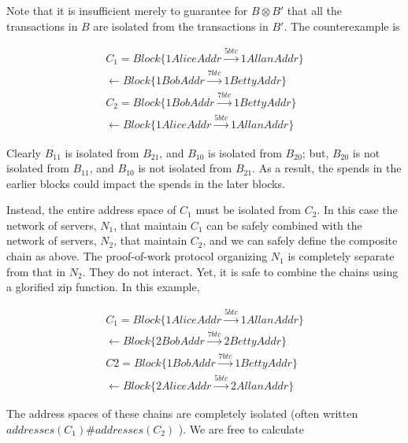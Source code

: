 \documentclass[]{acm_proc_article-sp}
\numberwithin{equation}{subsection}
\begin{document}
Note that it is insufficient merely to guarantee for $B \otimes B'$ that all
the transactions in $B$ are isolated from the transactions in $B'$. The
counterexample is

\begin{equation*}
  \begin{aligned}
    C_1 = Block\{ 1AliceAddr \xrightarrow{5btc} 1AllanAddr \} \\
    \leftarrow Block\{ 1BobAddr \xrightarrow{7btc} 1BettyAddr \} \\
    C_2 = Block\{ 1BobAddr \xrightarrow{7btc} 1BettyAddr \} \\
    \leftarrow Block\{ 1AliceAddr \xrightarrow{5btc} 1AllanAddr \}
  \end{aligned}
\end{equation*}

Clearly $B_{11}$ is isolated from $B_{21}$, and $B_{10}$ is isolated
from $B_{20}$; but, $B_{20}$ is not isolated from $B_{11}$, and
$B_{10}$ is not isolated from $B_{21}$. As a result, the spends in the
earlier blocks could impact the spends in the later blocks.

Instead, the entire address space of $C_1$ must be isolated from
$C_2$. In this case the network of servers, $N_1$, that maintain $C_1$ can
be safely combined with the network of servers, $N_2$, that maintain $C_2$,
and we can safely define the composite chain as above. The
proof-of-work protocol organizing $N_1$ is completely separate from that
in $N_2$. They do not interact. Yet, it is safe to combine the chains
using a glorified zip function. In this example,

\begin{equation*}
  \begin{aligned} 
    C_1 = Block\{ 1AliceAddr \xrightarrow{5btc} 1AllanAddr \} \\
    \leftarrow Block\{ 2BobAddr \xrightarrow{7btc} 2BettyAddr \} \\
    C2 = Block\{ 1BobAddr \xrightarrow{7btc} 1BettyAddr \} \\
    \leftarrow Block\{ 2AliceAddr \xrightarrow{5btc} 2AllanAddr \}
  \end{aligned}
\end{equation*}

The address spaces of these chains are completely isolated (often
written $addresses( C_1 ) \# addresses( C_2 )$ ). We are free to calculate
\end{document}
